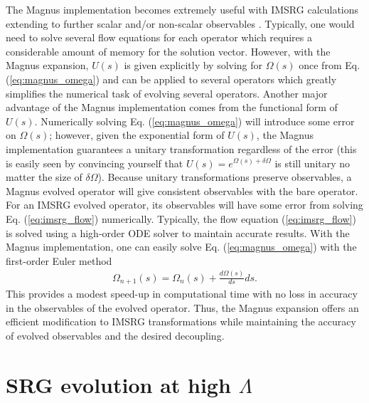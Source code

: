 \documentclass[preprintnumbers,floatfix,aps,prc,preprint]{revtex4-1}
\begin{document}
The Magnus implementation becomes extremely useful with IMSRG calculations extending to further scalar and/or non-scalar observables \cite{Parzuchowski:2017}. Typically, one would need to solve several flow equations for each operator which requires a considerable amount of memory for the solution vector. However, with the Magnus expansion, $U(s)$ is given explicitly by solving for $\Omega(s)$ once from Eq. (\ref{eq:magnus_omega}) and can be applied to several operators which greatly simplifies the numerical task of evolving several operators. Another major advantage of the Magnus implementation comes from the functional form of $U(s)$. Numerically solving Eq. (\ref{eq:magnus_omega}) will introduce some error on $\Omega(s)$; however, given the exponential form of $U(s)$, the Magnus implementation guarantees a unitary transformation regardless of the error (this is easily seen by convincing yourself that $U(s)=e^{\Omega(s)+\delta \Omega}$ is still unitary no matter the size of $\delta \Omega$). Because unitary transformations preserve observables, a Magnus evolved operator will give consistent observables with the bare operator. For an IMSRG evolved operator, its observables will have some error from solving Eq. (\ref{eq:imsrg_flow}) numerically. Typically, the flow equation (\ref{eq:imsrg_flow}) is solved using a high-order ODE solver to maintain accurate results. With the Magnus implementation, one can easily solve Eq. (\ref{eq:magnus_omega}) with the first-order Euler method
%
\begin{eqnarray}
\label{eq:euler_method}
\Omega_{n+1}(s) = \Omega_{n}(s) + \frac{d\Omega(s)}{ds} ds.
\end{eqnarray}
%
This provides a modest speed-up in computational time with no loss in accuracy in the observables of the evolved operator. Thus, the Magnus expansion offers an efficient modification to IMSRG transformations while maintaining the accuracy of evolved observables and the desired decoupling.

\section{SRG evolution at high $\Lambda$}
\label{sec:srg_high_lambda}
\end{document}
